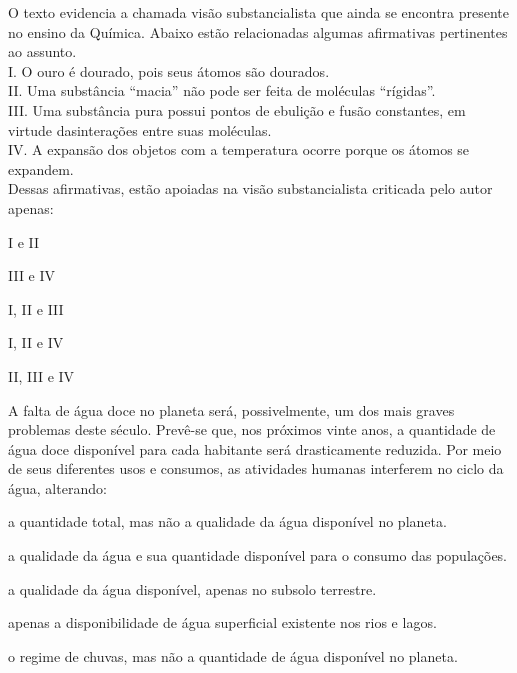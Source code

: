 \questao
{}
O texto evidencia a chamada visão substancialista que ainda se encontra presente no ensino da Química. Abaixo estão relacionadas algumas afirmativas pertinentes ao assunto.\\
I. O ouro é dourado, pois seus átomos são dourados.\\
II. Uma substância “macia” não pode ser feita de moléculas “rígidas”.\\
III. Uma substância pura possui pontos de ebulição e fusão constantes, em virtude dasinterações entre suas moléculas.\\
IV. A expansão dos objetos com a temperatura ocorre porque os átomos se expandem.\\
Dessas afirmativas, estão apoiadas na visão substancialista criticada pelo autor apenas:\\
\begin{alternativas}
\item I e II
\item III e IV
\item I, II e III
\item I, II e IV
\item II, III e IV
\end{alternativas}

\questao
A falta de água doce no planeta será, possivelmente, um dos mais graves problemas deste século. Prevê-se que, nos próximos vinte anos, a quantidade de água doce disponível para cada habitante será drasticamente reduzida. Por meio de seus diferentes usos e consumos, as atividades humanas interferem no ciclo da água, alterando:
\begin{alternativas}
\item a quantidade total, mas não a qualidade da água disponível no planeta.
\item a qualidade da água e sua quantidade disponível para o consumo das populações.
\item a qualidade da água disponível, apenas no subsolo terrestre.
\item apenas a disponibilidade de água superficial existente nos rios e lagos.
\item o regime de chuvas, mas não a quantidade de água disponível no planeta.
\end{alternativas}

